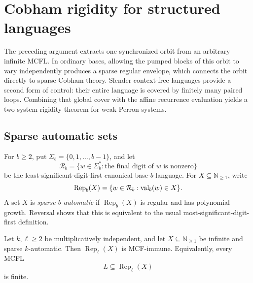 \section{Cobham rigidity for structured languages}
\label{sec:slender-cobham}

The preceding argument extracts one synchronized orbit from an arbitrary
infinite MCFL. In ordinary bases, allowing the pumped blocks of this orbit
to vary independently produces a sparse regular envelope, which connects
the orbit directly to sparse Cobham theory. Slender context-free languages
provide a second form of control: their entire language is covered by
finitely many paired loops. Combining that global cover with the affine
recurrence evaluation yields a two-system rigidity theorem for weak-Perron
systems.

\subsection{Sparse automatic sets}

For \(b\ge2\), put \(\Sigma_b=\{0,1,\ldots,b-1\}\), and let
\[
  \mathcal R_b=\{w\in\Sigma_b^\ast:\text{the final digit of }w
    \text{ is nonzero}\}
\]
be the least-significant-digit-first canonical base-\(b\) language. For
\(X\subseteq\mathbb N_{\ge1}\), write
\[
  \operatorname{Rep}_b(X)
    =\{w\in\mathcal R_b:\operatorname{val}_b(w)\in X\}.
\]
A set \(X\) is \emph{sparse \(b\)-automatic} if
\(\operatorname{Rep}_b(X)\) is regular and has polynomial growth. Reversal
shows that this is equivalent to the usual most-significant-digit-first
definition.

\begin{theorem}
  \label{thm:sparse-automatic-independent-base-mcf-immune}
  Let \(k,\ell\ge2\) be multiplicatively independent, and let
  \(X\subseteq\mathbb N_{\ge1}\) be infinite and sparse \(k\)-automatic. Then
  \(\operatorname{Rep}_\ell(X)\) is MCF-immune. Equivalently, every MCFL
  \[
    L\subseteq\operatorname{Rep}_\ell(X)
  \]
  is finite.
\end{theorem}


